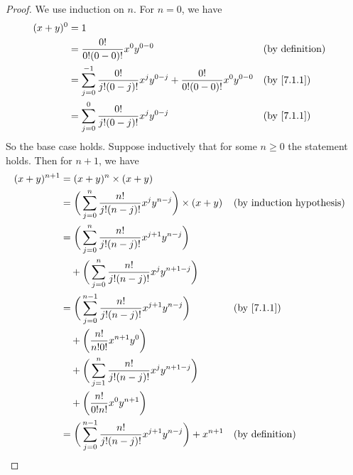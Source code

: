 \begin{proof}
  We use induction on \(n\).
  For \(n = 0\), we have
  \begin{align*}
    (x + y)^0 & = 1                                                                                                                         \\
              & = \dfrac{0!}{0!(0 - 0)!} x^0 y^{0 - 0}                                                          &  & \text{(by definition)} \\
              & = \sum_{j = 0}^{-1} \dfrac{0!}{j!(0 - j)!} x^j y^{0 - j} + \dfrac{0!}{0!(0 - 0)!} x^0 y^{0 - 0} &  & \by{7.1.1}             \\
              & = \sum_{j = 0}^0 \dfrac{0!}{j!(0 - j)!} x^j y^{0 - j}                                           &  & \by{7.1.1}
  \end{align*}
  So the base case holds.
  Suppose inductively that for some \(n \geq 0\) the statement holds.
  Then for \(n + 1\), we have
  \begin{align*}
    (x + y)^{n + 1} & = (x + y)^n \times (x + y)                                                                                              \\
                    & = \bigg(\sum_{j = 0}^n \dfrac{n!}{j!(n - j)!} x^j y^{n - j}\bigg) \times (x + y)            &  & \byIH                  \\
                    & = \bigg(\sum_{j = 0}^n \dfrac{n!}{j!(n - j)!} x^{j + 1} y^{n - j}\bigg)                                                 \\
                    & \quad + \bigg(\sum_{j = 0}^n \dfrac{n!}{j!(n - j)!} x^j y^{n + 1 - j}\bigg)                                             \\
                    & = \bigg(\sum_{j = 0}^{n - 1} \dfrac{n!}{j!(n - j)!} x^{j + 1} y^{n - j}\bigg)               &  & \by{7.1.1}             \\
                    & \quad + \bigg(\dfrac{n!}{n!0!} x^{n + 1} y^0\bigg)                                                                      \\
                    & \quad + \bigg(\sum_{j = 1}^n \dfrac{n!}{j!(n - j)!} x^j y^{n + 1 - j}\bigg)                                             \\
                    & \quad + \bigg(\dfrac{n!}{0!n!} x^0 y^{n + 1}\bigg)                                                                      \\
                    & = \bigg(\sum_{j = 0}^{n - 1} \dfrac{n!}{j!(n - j)!} x^{j + 1} y^{n - j}\bigg) + x^{n + 1}   &  & \text{(by definition)} \\

\end{align*}
\end{proof}
